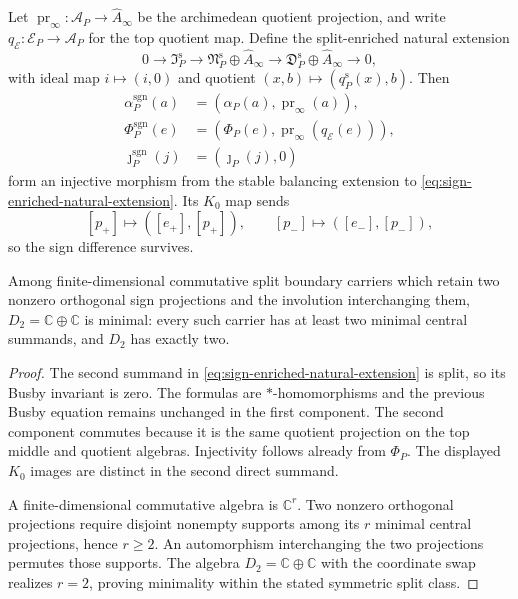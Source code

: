 \begin{proposition}
\label{prop:minimal-symmetric-sign-enrichment}
Let $\operatorname{pr}_\infty:\mathcal A_P\to\widehat A_\infty$ be the
archimedean quotient projection, and write
$q_{\mathcal E}:\mathcal E_P\to\mathcal A_P$ for the top quotient map.
Define the split-enriched natural extension
\begin{equation}
 0\to\mathfrak I_P^{\mathrm s}
 \longrightarrow
 \mathfrak N_P^{\mathrm s}\oplus\widehat A_\infty
 \longrightarrow
 \mathfrak D_P^{\mathrm s}\oplus\widehat A_\infty
 \to0,
 \label{eq:sign-enriched-natural-extension}
\end{equation}
with ideal map $i\mapsto(i,0)$ and quotient
$(x,b)\mapsto(q_P^{\mathrm s}(x),b)$.  Then
\begin{align*}
 \alpha_P^{\mathrm{sgn}}(a)
   &=(\alpha_P(a),\operatorname{pr}_\infty(a)),\\
 \Phi_P^{\mathrm{sgn}}(e)
   &=(\Phi_P(e),\operatorname{pr}_\infty(q_{\mathcal E}(e))),\\
 \jmath_P^{\mathrm{sgn}}(j)&=(\jmath_P(j),0)
\end{align*}
form an injective morphism from the stable balancing extension to
\eqref{eq:sign-enriched-natural-extension}.  Its $K_0$ map sends
\[
 [p_+]\longmapsto([e_+],[p_+]),\qquad
 [p_-]\longmapsto([e_-],[p_-]),
\]
so the sign difference survives.

Among finite-dimensional commutative split boundary carriers which retain two
nonzero orthogonal sign projections and the involution interchanging them,
$D_2=\mathbb C\oplus\mathbb C$ is minimal: every such carrier has at least
two minimal central summands, and $D_2$ has exactly two.
\end{proposition}

\begin{proof}
The second summand in \eqref{eq:sign-enriched-natural-extension} is split, so
its Busby invariant is zero.  The formulas are $*$-homomorphisms and the
previous Busby equation remains unchanged in the first component.  The second
component commutes because it is the same quotient projection on the top
middle and quotient algebras.  Injectivity follows already from $\Phi_P$.
The displayed $K_0$ images are distinct in the second direct summand.

A finite-dimensional commutative algebra is $\mathbb C^r$.  Two nonzero
orthogonal projections require disjoint nonempty supports among its $r$
minimal central projections, hence $r\geq2$.  An automorphism interchanging
the two projections permutes those supports.  The algebra
$D_2=\mathbb C\oplus\mathbb C$ with the coordinate swap realizes $r=2$,
proving minimality within the stated symmetric split class.
\end{proof}

